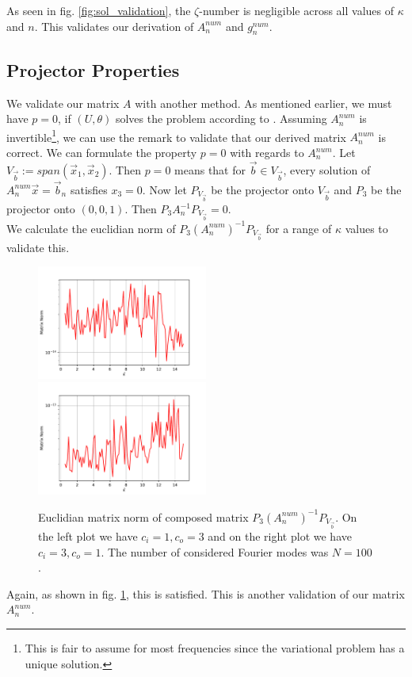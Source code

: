 \documentclass[12pt,journal,compsoc, onecolumn]{IEEEtran}
\begin{document}
\noindent
As seen in fig. \ref{fig:sol_validation}, the $\zeta$-number is negligible across all values of $\kappa$ and $n$. This validates our derivation of $A_n^{num}$ and $g_n^{num}$.
\subsection{Projector Properties}
\label{subsection:projector_properties}
We validate our matrix $A$ with another method. As mentioned earlier, we must have \(p=0\), if \((U, \theta)\) solves the problem according to \cite{meury2007stable}. 
Assuming $A^{num}_n$ is invertible\footnote{This is fair to assume for most frequencies since the variational problem has a unique solution.}, we can use the remark to validate that our derived matrix $A^{num}_n$ is correct.  We can formulate the property $p = 0$ with regards to $A^{num}_n$. 
Let $V_{\vec{b}} := span( \vec{x}_1, \vec{x}_2)$. 
Then $p = 0$ means that for $\vec{b} \in V_{\vec{b}}$, every solution of  $A_n^{num} \vec{x} = \vec{b}_n$ satisfies $x_3 = 0$. Now let
$P_{V_{\vec{b}}}$ be the projector onto $V_{\vec{b}}$ and $P_3$ be the projector onto $(0, 0, 1)$.
Then $P_3A_n^{-1}P_{V_{\vec{b}}} = 0$. \\
We calculate the euclidian norm of $P_3 (A^{num}_n)^{-1}P_{V_{\vec{b}}}$ for a range of $\kappa$ values to validate this.
\begin{figure}
    \includegraphics[width=0.5\textwidth]{validate_p_c_i1,0c_o3,0N_100plotRangeStart_0,5plotRangeEnd_15,0.pdf}
    \includegraphics[width=0.5\textwidth]{validate_p_c_i3,0c_o1,0N_100plotRangeStart_0,5plotRangeEnd_15,0.pdf}
    \caption{Euclidian matrix norm of composed matrix  $P_3 (A^{num}_n)^{-1}P_{V_{\vec{b}}}$. 
    On the left plot we have $c_i = 1, c_o = 3$
    and on the right plot we have $c_i = 3, c_o = 1$. The number of considered Fourier modes was $N = 100$.
    }
   \label{fig:p_validation}
\end{figure}
\noindent
Again, as shown in fig. \ref{fig:p_validation}, this is satisfied. This is another validation of our matrix $A_n^{num}$. 
\end{document}
